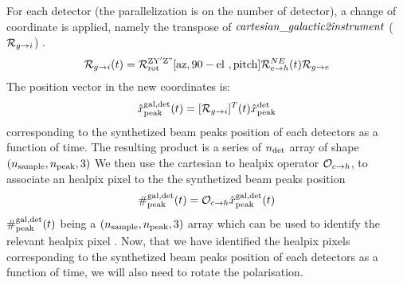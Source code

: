 \documentclass[a4paper, 11pt]{article}
\def\ba{\begin{eqnarray}}
\def\ea{\end{eqnarray}}
\begin{document}
\begin{enumerate}
For each detector (the parallelization is on the number of detector), a change of coordinate is applied, namely the transpose of ${\it cartesian\_galactic2instrument}$  (${\cal R}_{g \rightarrow i} $) . 
\ba
{\cal R}_{g \rightarrow i} (t) =    {\cal R}^{\rm Z  Y' Z"}_{\rm rot} [ {\rm az}, {\rm 90-el },  {\rm pitch}]  {\cal R}^{NE}_{e \rightarrow h}(t) {\cal R}_{g \rightarrow e}
\ea
The position vector in the new coordinates is:
\ba
\hat{x}^{\rm gal, det}_{\rm peak} (t) =  [{\cal R}_{g \rightarrow i}]^{T} (t) \hat{x}_{\rm peak}^{\rm  det} 
\ea
corresponding to the synthetized beam peaks position of each detectors as a function of time. The resulting product is a series of $n_{\rm det}$ array of shape$ (n_{\rm sample}, n_{\rm peak}, 3) $ 
We then use the cartesian to healpix operator ${\cal O}_{c \rightarrow h}$, to associate an healpix pixel to the the synthetized beam peaks position 
\ba
 \#^{\rm gal, det}_{\rm peak} (t) =  {\cal O}_{c \rightarrow h} \hat{x}^{\rm gal, det}_{\rm peak} (t)
\ea
$ \#^{\rm gal, det}_{\rm peak} (t)  $ being a $ (n_{\rm sample}, n_{\rm peak}, 3) $ array which can be used to identify the relevant healpix pixel .
Now, that we have identified the healpix pixels corresponding to the synthetized beam peaks position of each detectors as a function of time, we will also need to rotate the polarisation.


\end{enumerate}
\end{document}
